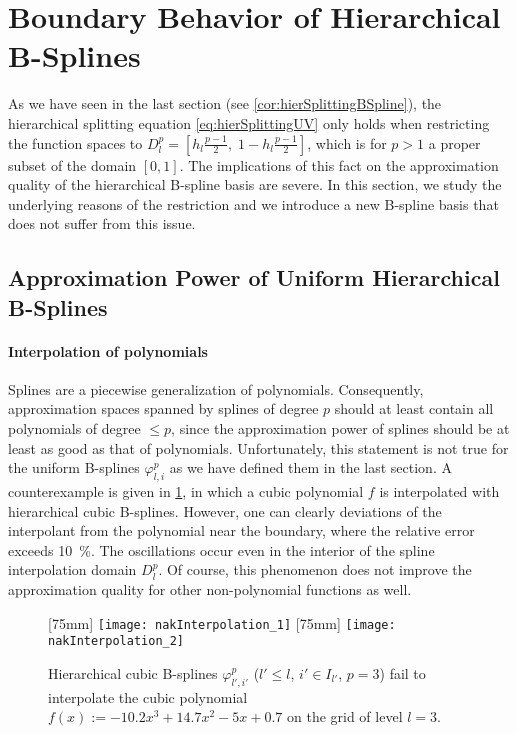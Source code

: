 \section{Boundary Behavior of Hierarchical B-Splines}
\label{sec:32notAKnot}

As we have seen in the last section (see \cref{cor:hierSplittingBSpline}),
the hierarchical splitting equation \eqref{eq:hierSplittingUV}
only holds when restricting the function spaces to
$D_l^p = [h_l \tfrac{p-1}{2},\; 1 - h_l \tfrac{p-1}{2}]$,
which is for $p > 1$ a proper subset of the domain $[0, 1]$.
The implications of this fact on the approximation quality
of the hierarchical B-spline basis are severe.
In this section, we study the underlying reasons of the restriction and
we introduce a new B-spline basis that does not suffer from this issue.



\subsection{Approximation Power of Uniform Hierarchical B-Splines}
\label{sec:321approximation}

\paragraph{Interpolation of polynomials}

Splines are a piecewise generalization of polynomials.
Consequently, approximation spaces spanned by splines of degree $p$ should
at least contain all polynomials of degree $\le p$,
since the approximation power of splines should be at least as good
as that of polynomials.
Unfortunately, this statement is not true for the uniform B-splines
$\varphi_{l,i}^p$ as we have defined them in the last section.
A counterexample is given in \cref{fig:nakInterpolation},
in which a cubic polynomial $f$ is interpolated with
hierarchical cubic B-splines.
However, one can clearly deviations of the interpolant from the polynomial
near the boundary, where the relative error exceeds \SI{10}{\percent}.
The oscillations occur even in the interior of the
spline interpolation domain $D_l^p$.
Of course, this phenomenon does not improve the approximation quality
for other non-polynomial functions as well.

\begin{figure}
  [75mm]{%
    \texttt{[image: nakInterpolation\_1]}%
  }%
  \hfill%
  [75mm]{%
    \texttt{[image: nakInterpolation\_2]}%
  }%
  \caption{%
    Hierarchical cubic B-splines $\varphi_{l',i'}^p$
    ($l' \le l$, $i' \in I_{l'}$, $p = 3$)
    fail to interpolate the cubic polynomial
    $f(x) := -10.2 x^3 + 14.7 x^2 - 5x + 0.7$
    on the grid of level $l = 3$.%
  }
  \label{fig:nakInterpolation}
\end{figure}

